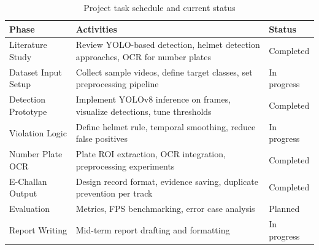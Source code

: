 \begin{table}[H]
\centering
\begin{tabularx}{\textwidth}{|l|X|l|}
\hline
\textbf{Phase} & \textbf{Activities} & \textbf{Status} \\
\hline
Literature Study & Review YOLO-based detection, helmet detection approaches, OCR for number plates & Completed \\
\hline
Dataset \/ Input Setup & Collect sample videos, define target classes, set preprocessing pipeline & In progress \\
\hline
Detection Prototype & Implement YOLOv8 inference on frames, visualize detections, tune thresholds & Completed \\
\hline
Violation Logic & Define helmet rule, temporal smoothing, reduce false positives & In progress \\
\hline
Number Plate OCR & Plate ROI extraction, OCR integration, preprocessing experiments &Completed \\
\hline
E-Challan Output & Design record format, evidence saving, duplicate prevention per track & Completed \\
\hline
Evaluation & Metrics, FPS benchmarking, error case analysis & Planned \\
\hline
Report Writing & Mid-term report drafting and formatting & In progress \\
\hline
\end{tabularx}
\caption{Project task schedule and current status}
\end{table}
